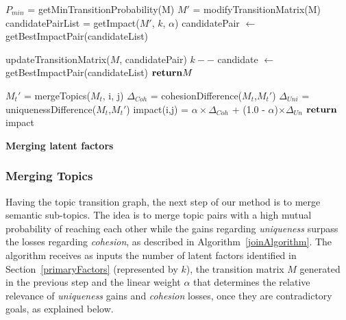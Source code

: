 \begin{algorithm}[!t]
    \begin{algorithmic}[1]
    \begin{small}
 

           \State \label{point1} $P_{min}$ = getMinTransitionProbability(M)
            \State \label{point2} $M'$ = modifyTransitionMatrix(M)
            \State \label{point3} candidatePairList = getImpact($M'$, $k$, $\alpha$)
            \State \label{point4}candidatePair $\gets$ getBestImpactPair(candidateList)

                \State updateTransitionMatrix($M$, candidatePair)
                \State $k --$
                \State candidate $\gets$ getBestImpactPair(candidateList)
            \EndWhile                
        \EndWhile
        \State $\Return M$        
    \EndFunction

                \State $M_t'$ = mergeTopics($M_t$, i, j)
                \State $\Delta_{Coh}$ = cohesionDifference($M_t$,$M_t'$)
                \State $\Delta_{Uni}$ = uniquenessDifference($M_t$,$M_t'$)
                \State impact(i,j) = $\alpha \times \Delta_{Coh}$ + (1.0 - $\alpha$)$ \times \Delta_{Un}$
            \EndFor
        \EndFor
        \State $\Return$ impact
    \EndFunction
    \end{small}
    \end{algorithmic}
\caption{\textbf{Merging latent factors}}
\label{joinAlgorithm}
\end{algorithm}

\subsubsection{Merging Topics}


Having the topic transition graph, the next step of our method is to merge semantic
sub-topics.  The idea is to merge topic pairs with a high mutual probability
of reaching each other while the gains regarding \textit{uniqueness} surpass
the losses regarding \textit{cohesion}, as described in
Algorithm~\ref{joinAlgorithm}.  The algorithm receives as inputs the number of latent
factors identified in Section~\ref{primaryFactors} (represented by
$k$), the transition matrix $M$ generated in the previous step and the
linear weight $\alpha$ that determines the relative relevance of
\textit{uniqueness} gains and \textit{cohesion} losses, once they are
contradictory goals, as explained below. 

